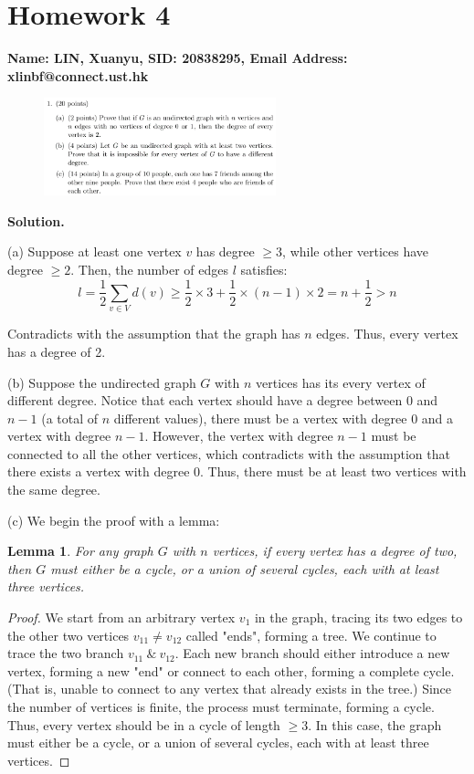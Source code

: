 \documentclass[10pt]{article}
\newtheorem*{lemma}{Lemma}
\begin{document}
\newpage

\section*{Homework 4}

\textbf{Name: LIN, Xuanyu, SID: 20838295, Email Address: xlinbf@connect.ust.hk}

\begin{figure}[h]
	\centering
	\includegraphics[width=0.6\textwidth]{hw4-1}
\end{figure}

\textbf{Solution.}

(a) Suppose at least one vertex $v$ has degree $\geq 3$, while other vertices have degree $\geq 2$. Then, the number of edges $l$ satisfies:
\[
	l = \frac{1}{2} \sum_{v\in V} d(v) \geq \frac{1}{2} \times 3 + \frac{1}{2} \times (n-1) \times 2 = n + \frac{1}{2} > n
\]

Contradicts with the assumption that the graph has $n$ edges. Thus, every vertex has a degree of 2.

\vspace*{1em}

(b) Suppose the undirected graph $G$ with $n$ vertices has its every vertex of different degree. Notice that each vertex should have a degree between 0 and $n-1$ (a total of $n$ different values), there must be a vertex with degree 0 and a vertex with degree $n-1$. However, the vertex with degree $n-1$ must be connected to all the other vertices, which contradicts with the assumption that there exists a vertex with degree 0. Thus, there must be at least two vertices with the same degree.

\vspace*{1em}

(c) We begin the proof with a lemma:
\begin{lemma}
	For any graph $G$ with $n$ vertices, if every vertex has a degree of two, then $G$ must either be a cycle, or a union of several cycles, each with at least three vertices.
\end{lemma}
\begin{proof}
	We start from an arbitrary vertex $v_1$ in the graph, tracing its two edges to the other two vertices $v_{11}\neq v_{12}$ called "ends", forming a tree. We continue to trace the two branch $v_{11}\ \&\ v_{12}$. Each new branch should either introduce a new vertex, forming a new "end" or connect to each other, forming a complete cycle. (That is, unable to connect to any vertex that already exists in the tree.) Since the number of vertices is finite, the process must terminate, forming a cycle. Thus, every vertex should be in a cycle of length $\geq 3$. In this case, the graph must either be a cycle, or a union of several cycles, each with at least three vertices.
\end{proof}
\end{document}
